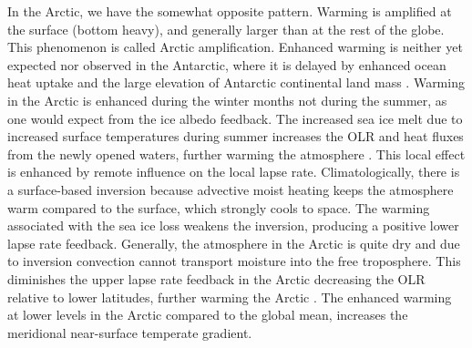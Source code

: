 In the Arctic, we have the somewhat opposite pattern. Warming is amplified at the surface (bottom heavy), and generally larger than at the rest of the globe. This phenomenon is called Arctic amplification. Enhanced warming is neither yet expected nor observed in the Antarctic, where it is delayed by enhanced ocean heat uptake \parencite{armourSouthernOceanWarming2016} and the large elevation of Antarctic continental land mass \parencite{hahnAntarcticElevationDrives2020}. Warming in the Arctic is enhanced during the winter months not during the summer, as one would expect from the ice albedo feedback. The increased sea ice melt due to increased surface temperatures during summer increases the OLR and heat fluxes from the newly opened waters, further warming the atmosphere \parencite{daiArcticAmplificationCaused2019}. This local effect is enhanced by remote influence on the local lapse rate. Climatologically, there is a surface-based inversion because advective moist heating keeps the atmosphere warm compared to the surface, which strongly cools to space. The warming associated with the sea ice loss weakens the inversion, producing a positive lower lapse rate feedback. Generally, the atmosphere in the Arctic is quite dry and due to inversion convection cannot transport moisture into the free troposphere. This diminishes the upper lapse rate feedback in the Arctic decreasing the OLR relative to lower latitudes, further warming the Arctic \parencite{feldlSeaIceAtmospheric2020}. The enhanced warming at lower levels in the Arctic compared to the global mean, increases the meridional near-surface temperate gradient. 

